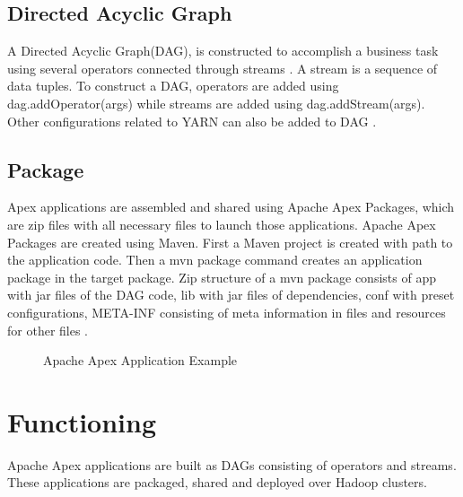 \documentclass[9pt,twocolumn,twoside]{../../styles/osajnl}
\begin{document}
\subsection{Directed Acyclic Graph}
A Directed Acyclic Graph(DAG), is constructed to accomplish a business task using several operators connected through streams \cite{www-apacheapexappdevdoc}. A stream is a sequence of data tuples.
To construct a DAG, operators are added using dag.addOperator(args) while streams are added using dag.addStream(args). Other configurations related to YARN can also be added to DAG \cite{www-apacheapexinslideshare}.

\subsection{Package}
Apex applications are assembled and shared using Apache Apex Packages, which are zip files with all necessary files to launch those applications.
Apache Apex Packages are created using Maven.                 
First a Maven project is created with path to the application code. 
Then a mvn package command creates an application package in the target package.
Zip structure of a mvn package consists of app with jar files of the DAG code, lib with jar files of dependencies, conf with preset configurations, META-INF consisting of meta information in files and resources for other files \cite{www-apacheapexpackagedoc}.
\begin{figure}[ht!]
\centering
{}
\caption{Apache Apex Application Example \cite{www-apacheapexblog}}
\label{fig:Apache Apex Application Example}
\end{figure}


\section{Functioning}
Apache Apex applications are built as DAGs consisting of operators and streams. These applications  are packaged, shared and deployed over Hadoop clusters.
\end{document}
